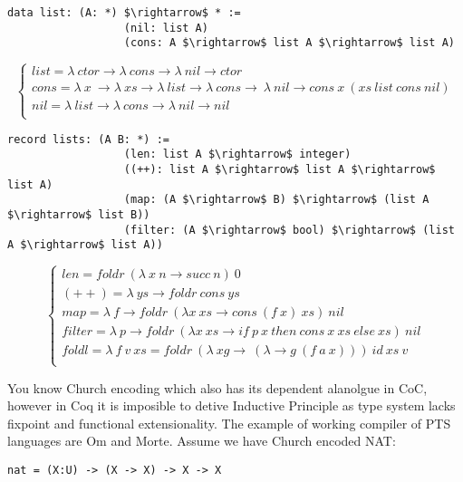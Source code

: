 \begin{lstlisting}[mathescape=true]
             data list: (A: *) $\rightarrow$ * :=
                  (nil: list A)
                  (cons: A $\rightarrow$ list A $\rightarrow$ list A)
\end{lstlisting}
$$
\begin{cases}
list = \lambda\ ctor \rightarrow \lambda\ cons \rightarrow \lambda\ nil \rightarrow ctor\\
cons = \lambda\ x\ \rightarrow \lambda\ xs \rightarrow \lambda\ list \rightarrow \lambda\ cons \rightarrow\ \lambda\ nil \rightarrow cons\ x\ (xs\ list\ cons\ nil)\\
nil = \lambda\ list \rightarrow \lambda\ cons \rightarrow \lambda\ nil \rightarrow nil\\
\end{cases}
$$
\begin{lstlisting}[mathescape=true]
           record lists: (A B: *) :=
                  (len: list A $\rightarrow$ integer)
                  ((++): list A $\rightarrow$ list A $\rightarrow$ list A)
                  (map: (A $\rightarrow$ B) $\rightarrow$ (list A $\rightarrow$ list B))
                  (filter: (A $\rightarrow$ bool) $\rightarrow$ (list A $\rightarrow$ list A))
\end{lstlisting}
$$
\begin{cases}
len = foldr\ (\lambda\ x\ n \rightarrow succ\ n)\ 0\\
(++) = \lambda\ ys \rightarrow foldr\ cons\ ys\\
map = \lambda\ f \rightarrow foldr\ (\lambda x\ xs \rightarrow cons\ (f\ x)\ xs)\ nil\\
filter = \lambda\ p \rightarrow foldr\ (\lambda x\ xs \rightarrow if\ p\ x\ then\ cons\ x\ xs\ else\ xs)\ nil\\
foldl = \lambda\ f\ v\ xs = foldr\ (\lambda\ xg\rightarrow\ (\lambda \rightarrow g\ (f\ a\ x)))\ id\ xs\ v\\
\end{cases}
$$

You know Church encoding which also has its dependent alanolgue in CoC, however
in Coq it is imposible to detive Inductive Principle as type system lacks fixpoint
and functional extensionality. The example of working compiler of PTS languages are Om and Morte.
Assume we have Church encoded NAT:

\begin{lstlisting}[mathescape=true]
nat = (X:U) -> (X -> X) -> X -> X
\end{lstlisting}

